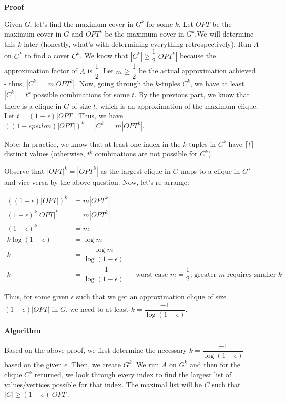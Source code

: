 \documentclass{article}
\begin{document}
\textbf{Proof}

Given $G$, let's find the maximum cover in $G^k$ for some $k$. Let $OPT$ be the maximum cover in $G$ and $OPT^k$ be the
maximum cover in $G^k$.We will determine this $k$ later (honestly, what's with determining everything retrospectively).
Run $A$ on $G^k$ to find a cover $C^k$. We know that $|C^k| \geq \dfrac{1}{2}|OPT^k|$ because the approximation factor of
$A$ is $\dfrac{1}{2}$. Let $m \geq \dfrac{1}{2}$ be the actual approximation achieved - thus, $|C^k| = m |OPT^k|$. Now,
going through the $k$-tuples \in $C^k$, we have at least $|C^k| = t^k$ possible combinations for some $t$. By the
previous part, we know that there is a clique in $G$ of size $t$, which is an approximation of the maximum clique. Let
$t = (1 - \epsilon)|OPT|$. Thus, we have $((1 - epsilon)|OPT|)^k = |C^k| = m |OPT^k|$.

Note: In practice, we know that at least one index in the $k$-tuples in $C^k$ have $\lceil t \rceil$ distinct values
(otherwise, $t^k$ combinations are not possible for $C^k$).

Observe that $|OPT|^k = |OPT^k|$ as the largest clique in $G$ maps to a clique in $G'$ and vice
versa by the above question. Now, let's re-arrange:

\begin{align*}
    ((1 - \epsilon)|OPT|)^k &= m|OPT^k| \\
    (1 - \epsilon)^k |OPT|^k &= m|OPT^k| \\
    (1 - \epsilon)^k  &= m \\
    k \log(1 - \epsilon)  &= \log m \\
    k &=\dfrac{\log m}{\log(1 - \epsilon)} \\
    k &= \dfrac{-1}{\log(1 - \epsilon)} && \text{worst case $m = \dfrac{1}{2}$; greater $m$ requires smaller $k$}
\end{align*}

Thus, for some given $\epsilon$ such that we get an approximation clique of size $(1 - \epsilon)|OPT|$ in $G$, we need
to at least $k = \dfrac{-1}{\log(1- \epsilon)}$.


\textbf{Algorithm}

Based on the above proof, we first determine the necessary $k = \dfrac{-1}{\log(1 - \epsilon)}$ based on the given
$\epsilon$. Then, we create $G^k$. We run $A$ on $G^k$ and then for the clique $C^k$ returned, we look through every
index to find the largest list of values/vertices possible for that index. The maximal list will be $C$ such that $|C|
\geq (1 - \epsilon)|OPT|$.
\end{document}
